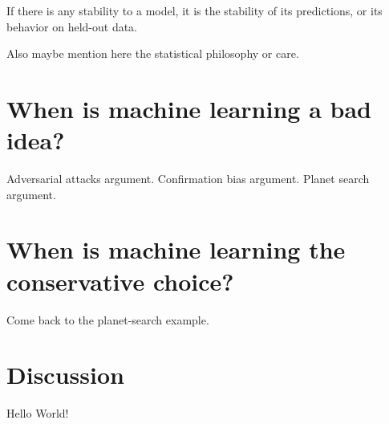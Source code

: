 \documentclass[11pt]{article}
\begin{document}
If there is any stability to a model, it is the stability of its predictions, or its behavior on held-out data.

Also maybe mention here the statistical philosophy or care.

\section{When is machine learning a bad idea?}

Adversarial attacks argument. Confirmation bias argument. Planet search argument.

\section{When is machine learning the conservative choice?}

Come back to the planet-search example.

\section{Discussion}\label{sec:discussion}

Hello World!



\end{document}
